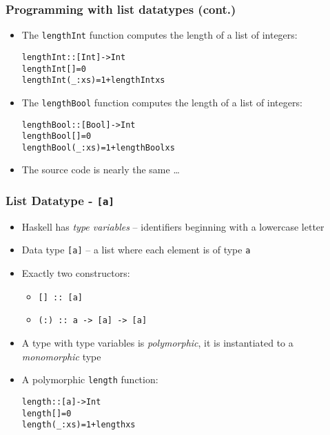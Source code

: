 \documentclass[final,handout]{beamer}
\begin{document}
\begin{frame}[fragile]
    \frametitle{Programming with list datatypes (cont.)}

    \begin{itemize}
        \item<1-> The \texttt{lengthInt} function computes the length of a list of integers:

    \begin{alltt}
    lengthInt :: [Int] -> Int
    lengthInt []       = 0
    lengthInt (_ : xs) = 1 + lengthInt xs
    \end{alltt}

        \item<2-> The \texttt{lengthBool} function computes the length of a list of integers:
    \begin{alltt}
    lengthBool :: [Bool] -> Int
    lengthBool []       = 0
    lengthBool (_ : xs) = 1 + lengthBool xs
    \end{alltt}

        \item<3-> The source code is nearly the same \dots {}

    \end{itemize}

\end{frame}

\begin{frame}[fragile]
    \frametitle{List Datatype - \texttt{[a]}}

    \begin{itemize}
        \item<1-> Haskell has \emph{type variables} -- identifiers beginning
            with a lowercase letter
        \item<2-> Data type \texttt{[a]} -- a list where each element is of
            type \texttt{a}
        \item<3-> Exactly two constructors:
            \begin{itemize}
                \item \texttt{[] :: [a]}                   
                \item \texttt{(:) :: a -> [a] -> [a]}                   
            \end{itemize}
        \item<4-> A type with type variables is \emph{polymorphic}, it is
            instantiated to a \emph{monomorphic} type 
        \item<5-> A polymorphic \texttt{length} function:
            \begin{alltt}
    length :: [a] -> Int
    length []       = 0
    length (_ : xs) = 1 + length xs
            \end{alltt}
    \end{itemize}
\end{frame}
\end{document}
